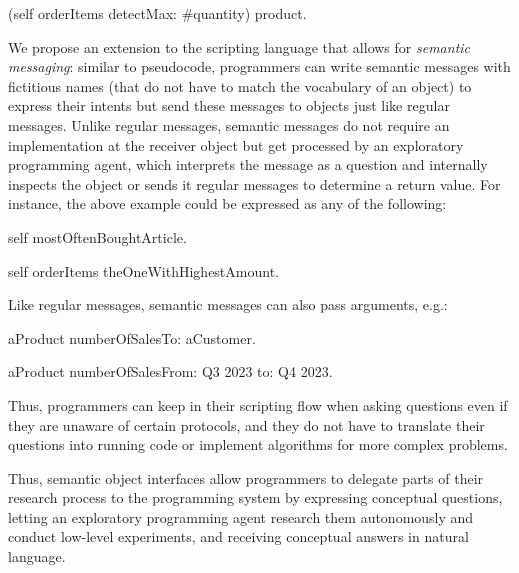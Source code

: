 \begin{multicode}
	(self orderItems detectMax: \#quantity) product.
\end{multicode}

We propose an extension to the scripting language that allows for \emph{semantic messaging}: similar to pseudocode, programmers can write semantic messages with fictitious names (that do not have to match the vocabulary of an object) to express their intents but send these messages to objects just like regular messages.
Unlike regular messages, semantic messages do not require an implementation at the receiver object but get processed by an exploratory programming agent, which interprets the message as a question and internally inspects the object or sends it regular messages to determine a return value.
For instance, the above example could be expressed as any of the following:
\begin{multicode}
	self mostOftenBoughtArticle.

	self orderItems theOneWithHighestAmount.
\end{multicode}
Like regular messages, semantic messages can also pass arguments, e.g.:
\begin{multicode}
	aProduct numberOfSalesTo: aCustomer.

	aProduct numberOfSalesFrom: \textquotesingle Q3 2023\textquotesingle{} to: \textquotesingle Q4 2023\textquotesingle.
\end{multicode}

Thus, programmers can keep in their scripting flow when asking questions even if they are unaware of certain protocols, and they do not have to translate their questions into running code or implement algorithms for more complex problems.

\ParSep

Thus, semantic object interfaces allow programmers to delegate parts of their research process to the programming system by expressing conceptual questions, letting an exploratory programming agent research them autonomously and conduct low-level experiments, and receiving conceptual answers in natural language.
